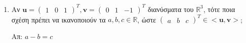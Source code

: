 \begin{enumerate}
                            \item Αν $ \mathbf{u} = 
                                \begin{pmatrix}1 & 0 & 1\end{pmatrix}^{T} , \mathbf{v} = 
                                \begin{pmatrix}0 & 1 & -1\end{pmatrix}^{T}$ διανύσματα του 
                                $ \mathbb{R}^{3} $, τότε ποια σχέση πρέπει να ικανοποιούν τα 
                                $ a,b,c \in \mathbb{R} $, ώστε $ 
                                \begin{pmatrix}a & b & c\end{pmatrix}^{T} \in < \mathbf{u}, \mathbf{v} > $;

                                \hfill Απ: $ a-b=c $ 
                        \end{enumerate}


                        




